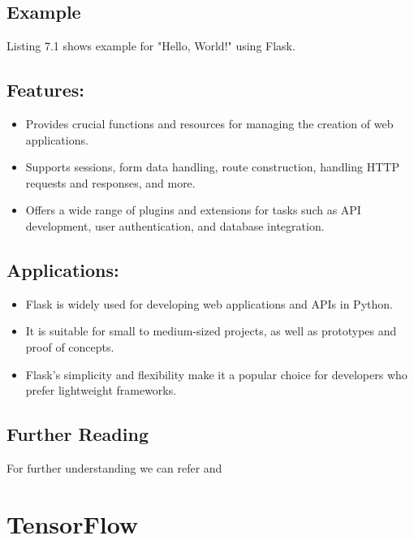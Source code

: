 \subsection{Example}

Listing 7.1 shows example for  "Hello, World!" using Flask.



\subsection{Features:}

\begin{itemize}
	\item Provides crucial functions and resources for managing the creation of web applications.
	\item Supports sessions, form data handling, route construction, handling HTTP requests and responses, and more.
	\item Offers a wide range of plugins and extensions for tasks such as API development, user authentication, and database integration.
\end{itemize}

\subsection{Applications:}

\begin{itemize}
	\item Flask is widely used for developing web applications and APIs in Python.
	\item It is suitable for small to medium-sized projects, as well as prototypes and proof of concepts.
	\item Flask's simplicity and flexibility make it a popular choice for developers who prefer lightweight frameworks.
\end{itemize}

\subsection{Further Reading}

For further understanding we can refer \cite{flaskdocs:2021} and \cite{hunt:2018}


\section{TensorFlow}

